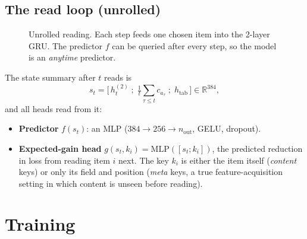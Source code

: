 \documentclass[11pt,a4paper]{article}
\newcommand{\htab}{h_{\mathrm{tab}}}
\begin{document}
\subsection{The read loop (unrolled)}
\begin{figure}[h]
\centering
{}
\caption{Unrolled reading. Each step feeds one chosen item into the 2-layer GRU.
The predictor $f$ can be queried after every step, so the model is an \emph{anytime} predictor.}
\end{figure}

The state summary after $t$ reads is
\[
  s_t=\big[\,h^{(2)}_t\;;\;\tfrac{1}{t}\textstyle\sum_{\tau\le t}c_{a_\tau}\;;\;\htab\,\big]\in\mathbb{R}^{384},
\]
and all heads read from it:
\begin{itemize}[nosep]
  \item \textbf{Predictor} $f(s_t)$: an MLP ($384\to256\to n_{\text{out}}$, GELU, dropout).
  \item \textbf{Expected-gain head} $g(s_t,k_i)=\mathrm{MLP}([s_t;k_i])$, the predicted reduction in loss from reading item $i$ next.
        The key $k_i$ is either the item itself (\emph{content} keys) or only its field and position (\emph{meta} keys, a true feature-acquisition setting in which content is unseen before reading).
\end{itemize}

\section{Training}
\end{document}
